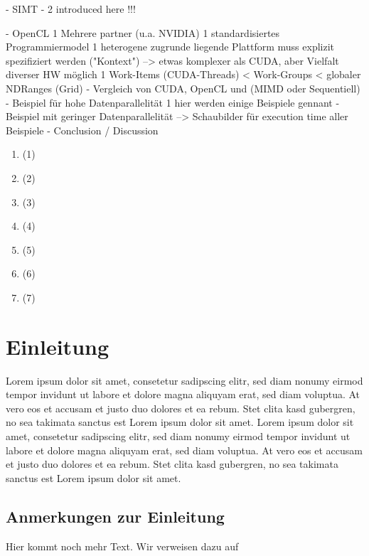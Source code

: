 \documentclass[a4paper,12pt]{llncs}
\numberwithin{equation}{section}
\begin{document}
        - SIMT
          - 
          2 introduced here !!!
        
      
    - OpenCL
      1 Mehrere partner (u.a. NVIDIA) 
      1 standardisiertes Programmiermodel
      1 heterogene zugrunde liegende Plattform muss explizit spezifiziert werden ("Kontext")
        --> etwas komplexer als CUDA, aber Vielfalt diverser HW möglich
      1 Work-Items (CUDA-Threads) < Work-Groups < globaler NDRanges (Grid)
- Vergleich von CUDA, OpenCL und (MIMD oder Sequentiell)
  - Beispiel für hohe Datenparallelität
  	1 hier werden einige Beispiele gennant
  - Beispiel mit geringer Datenparallelität
  --> Schaubilder für execution time aller Beispiele
- Conclusion / Discussion

\begin{enumerate}
\item \cite{Rauber.2012} (1)
\item \cite{Lindholm.2008} (2)
\item \cite{Burgess.2020} (3)
\item \cite{Huang.2008} (4)
\item \cite{Bialas.2016} (5)
\item \cite{Khronos.2019} (6)
\item \cite{Wang.2019} (7)
\end{enumerate}



\section{Einleitung}
Lorem ipsum dolor sit amet, consetetur sadipscing elitr, sed diam nonumy eirmod tempor invidunt ut labore et dolore magna aliquyam erat, sed diam voluptua. At vero eos et accusam et justo duo dolores et ea rebum. Stet clita kasd gubergren, no sea takimata sanctus est Lorem ipsum dolor sit amet. Lorem ipsum dolor sit amet, consetetur sadipscing elitr, sed diam nonumy eirmod tempor invidunt ut labore et dolore magna aliquyam erat, sed diam voluptua. At vero eos et accusam et justo duo dolores et ea rebum. Stet clita kasd gubergren, no sea takimata sanctus est Lorem ipsum dolor sit amet.

\subsection{Anmerkungen zur Einleitung}
Hier kommt noch mehr Text. Wir verweisen dazu auf
\end{document}
